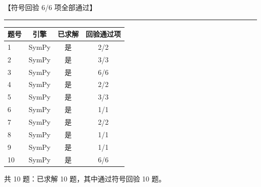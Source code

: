 \documentclass[12pt, a4paper]{article}
\begin{document}
\textcolor{okgreen}{【符号回验 6/6 项全部通过】}

\vspace{0.8em}
\hrule
\vspace{0.8em}

\begin{center}
\begin{tabular}{@{}lccc@{}}
\toprule
题号 & 引擎 & 已求解 & 回验通过项 \\
\midrule
    1 & SymPy & 是 & 2/2 \\
    2 & SymPy & 是 & 3/3 \\
    3 & SymPy & 是 & 6/6 \\
    4 & SymPy & 是 & 2/2 \\
    5 & SymPy & 是 & 3/3 \\
    6 & SymPy & 是 & 1/1 \\
    7 & SymPy & 是 & 2/2 \\
    8 & SymPy & 是 & 1/1 \\
    9 & SymPy & 是 & 1/1 \\
    10 & SymPy & 是 & 6/6 \\
\bottomrule
\end{tabular}
\end{center}

\noindent 共 10 题：已求解 10 题，其中通过符号回验 10 题。
\end{document}
